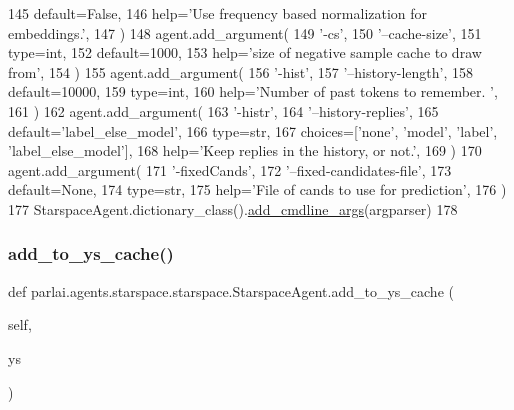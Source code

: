 \begin{DoxyCode}
145             default=\textcolor{keyword}{False},
146             help=\textcolor{stringliteral}{'Use frequency based normalization for embeddings.'},
147         )
148         agent.add\_argument(
149             \textcolor{stringliteral}{'-cs'},
150             \textcolor{stringliteral}{'--cache-size'},
151             type=int,
152             default=1000,
153             help=\textcolor{stringliteral}{'size of negative sample cache to draw from'},
154         )
155         agent.add\_argument(
156             \textcolor{stringliteral}{'-hist'},
157             \textcolor{stringliteral}{'--history-length'},
158             default=10000,
159             type=int,
160             help=\textcolor{stringliteral}{'Number of past tokens to remember. '},
161         )
162         agent.add\_argument(
163             \textcolor{stringliteral}{'-histr'},
164             \textcolor{stringliteral}{'--history-replies'},
165             default=\textcolor{stringliteral}{'label\_else\_model'},
166             type=str,
167             choices=[\textcolor{stringliteral}{'none'}, \textcolor{stringliteral}{'model'}, \textcolor{stringliteral}{'label'}, \textcolor{stringliteral}{'label\_else\_model'}],
168             help=\textcolor{stringliteral}{'Keep replies in the history, or not.'},
169         )
170         agent.add\_argument(
171             \textcolor{stringliteral}{'-fixedCands'},
172             \textcolor{stringliteral}{'--fixed-candidates-file'},
173             default=\textcolor{keywordtype}{None},
174             type=str,
175             help=\textcolor{stringliteral}{'File of cands to use for prediction'},
176         )
177         StarspaceAgent.dictionary\_class().\hyperlink{namespaceparlai_1_1agents_1_1drqa_1_1config_a62fdd5554f1da6be0cba185271058320}{add\_cmdline\_args}(argparser)
178 
\end{DoxyCode}
\mbox{\label{classparlai_1_1agents_1_1starspace_1_1starspace_1_1StarspaceAgent_ace15d00770ddf83193ddee499c7c87a1}} 
\subsubsection{\texorpdfstring{add\+\_\+to\+\_\+ys\+\_\+cache()}{add\_to\_ys\_cache()}}
{\footnotesize\ttfamily def parlai.\+agents.\+starspace.\+starspace.\+Starspace\+Agent.\+add\+\_\+to\+\_\+ys\+\_\+cache (\begin{DoxyParamCaption}\item[{}]{self,  }\item[{}]{ys }\end{DoxyParamCaption})}



